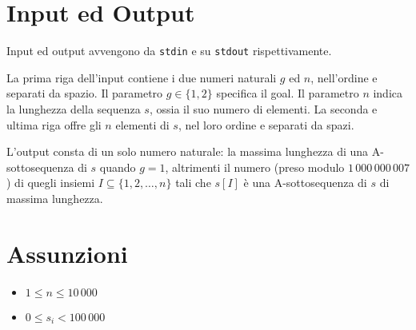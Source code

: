 \documentclass[a4paper,11pt]{article}
\begin{document}
\section*{Input ed Output}
Input ed output avvengono da \verb'stdin' e su \verb'stdout' rispettivamente.

La prima riga dell'input contiene i due numeri naturali $g$ ed $n$, nell'ordine e separati da spazio. Il parametro $g\in \{1,2\}$ specifica il goal. Il parametro $n$ indica la lunghezza della sequenza $s$, ossia il suo numero di elementi. La seconda e ultima riga offre gli $n$ elementi di $s$, nel loro ordine e separati da spazi.

L'output consta di un solo numero naturale:
la massima lunghezza di una A-sottosequenza di $s$ quando $g=1$, altrimenti il numero (preso modulo $1\,000\,000\,007$) di quegli insiemi $I\subseteq \{1,2, \ldots, n\}$ tali che $s[I]$ è una A-sottosequenza di $s$ di massima lunghezza.

\section*{Assunzioni}

\begin{itemize}
\item $1 \le n \le 10\,000$
\item $0 \le s_i < 100\,000$
\end{itemize}

\newpage
\end{document}
